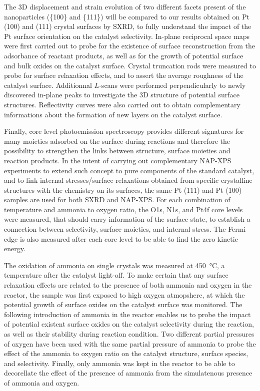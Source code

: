 The 3D displacement and strain evolution of two different facets present of the nanoparticles (\{100\} and \{111\}) will be compared to our results obtained on Pt (100) and (111) crystal surfaces by SXRD, to fully understand the impact of the Pt surface orientation on the catalyst selectivity.
In-plane reciprocal space maps were first carried out to probe for the existence of surface reconstruction from the adsorbance of reactant products, as well as for the growth of potential surface and bulk oxides on the catalyst surface.
Crystal truncation rods were measured to probe for surface relaxation effects, and to assert the average roughness of the catalyst surface.
Additionnal $L$-scans were performed perpendicularly to newly discovered in-plane peaks to investigate the 3D structure of potential surface structures.
Reflectivity curves were also carried out to obtain complementary informations about the formation of new layers on the catalyst surface.

Finally, core level photoemission spectroscopy provides different signatures for many moieties adsorbed on the surface during reactions and therefore the possibility to strengthen the links between structure, surface moieties and reaction products.
In the intent of carrying out complementary NAP-XPS experiments to extend such concept to pure components of the standard catalyst, and to link internal stresses/surface-relaxations obtained from specific crystalline structures with the chemistry on its surfaces, the same Pt (111) and Pt (100) samples are used for both SXRD and NAP-XPS.
For each combination of temperature and ammonia to oxygen ratio, the O1s, N1s, and Pt4f core levels were measured, that should carry information of the surface state, to establish a connection between selectivity, surface moieties, and internal stress.
The Fermi edge is also measured after each core level to be able to find the zero kinetic energy.

The oxidation of ammonia on single crystals was measured at \qty{450}{\degreeCelsius}, a temperature after the catalyst light-off.
To make certain that any surface relaxation effects are related to the presence of both ammonia and oxygen in the reactor, the sample was first exposed to high oxygen atmopshere, at which the potential growth of surface oxides on the catalyst surface was monitored.
The following introduction of ammonia in the reactor enables us to probe the impact of potential existent surface oxides on the catalyst selectivity during the reaction, as well as their stability during reaction condition.
Two different partial pressures of oxygen have been used with the same partial pressure of ammonia to probe the effect of the ammonia to oxygen ratio on the catalyst structure, surface species, and selectivity.
Finally, only ammonia was kept in the reactor to be able to decorellate the effect of the presence of ammonia from the simulatenous presence of ammonia and oxygen.

